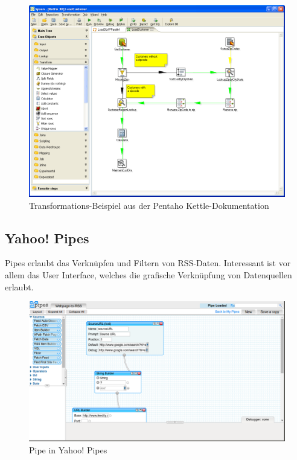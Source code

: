 \begin{figure}[H]
    \centering
    \includegraphics[width=2\linewidth/3]{fig/kettle-spoon-transformation}
    \caption{Transformations-Beispiel aus der Pentaho Kettle-Dokumentation}
\end{figure}

\subsection{Yahoo! Pipes}
Pipes erlaubt das Verknüpfen und Filtern von RSS-Daten. Interessant ist vor allem das User Interface, welches die grafische Verknüpfung von Datenquellen erlaubt.

\begin{figure}[H]
    \centering
    \includegraphics[width=2\linewidth/3]{fig/yahoo-pipes}
    \caption{Pipe in Yahoo! Pipes}
\end{figure}

